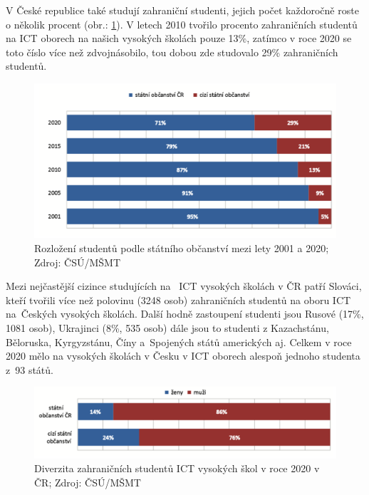\documentclass[12pt]{report}			%
\begin{document}
                V České republice také studují zahraniční studenti, jejich počet každoročně roste o několik procent (obr.: \ref{fig:obcanstvi_VS}). V letech 2010 tvořilo procento zahraničních studentů na ICT oborech na našich vysokých školách pouze 13\%, zatímco v roce 2020 se toto číslo více než zdvojnásobilo, tou dobou zde studovalo 29\% zahraničních studentů. 
                \begin{figure}[h]
                    \centering
                     \includegraphics[width=16cm]{Maturitni Prace/images/obcanstvi_VS.png}
                    \caption[Rozložení studentů podle státního občanství 2001/20]{Rozložení studentů podle státního občanství mezi lety 2001 a 2020; Zdroj: ČSÚ/MŠMT}
                    \label{fig:obcanstvi_VS}
                \end{figure}
                Mezi nejčastější cizince studujících na~ ICT vysokých školách v ČR patří Slováci, kteří tvořili více než polovinu (3248 osob) zahraničních studentů na oboru ICT na~Českých vysokých školách. Další hodně zastoupení studenti jsou Rusové (17\%, 1081 osob), Ukrajinci (8\%, 535 osob) dále jsou to studenti z Kazachstánu, Běloruska, Kyrgyzstánu, Číny a~Spojených států amerických aj. Celkem v roce 2020 mělo na vysokých školách v Česku v ICT oborech alespoň jednoho studenta z~93 států.\cite{LidskeZdrojeVIT}
                
                \begin{figure}[h]
                    \centering
                      \includegraphics[width=16cm]{Maturitni Prace/images/obcanstvi_a_pohlavi_VS.png}
                    \caption[Diverzita zahraničních studentů ICT vysokých škol v roce 2020 v ČR]{Diverzita zahraničních studentů ICT vysokých škol v roce 2020 v ČR; Zdroj: ČSÚ/MŠMT}
                    \label{fig:obcanstvi_a_pohlavi_VS}
                \end{figure}
                
\end{document}
